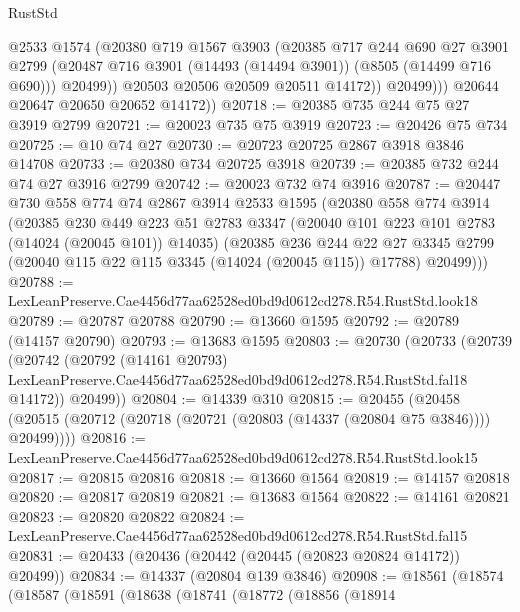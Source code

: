 \begin{lexlean}{RustStd}
\begin{coremodule}
                  @2533
                  @1574
                  (@20380
                    @719
                    @1567
                    @3903
                    (@20385
                      @717
                      @244
                      @690
                      @27
                      @3901
                      @2799
                      (@20487 @716 @3901 (@14493 (@14494 @3901)) (@8505 (@14499 @716 @690)))
                      @20499))
                  @20503
                  @20506
                  @20509
                  @20511
                  @14172))
              @20499)))
        @20644
        @20647
        @20650
        @20652
        @14172))
@20718 := @20385 @735 @244 @75 @27 @3919 @2799
@20721 := @20023 @735 @75 @3919
@20723 := @20426 @75 @734
@20725 := @10 @74 @27
@20730 := @20723 @20725 @2867 @3918 @3846 @14708
@20733 := @20380 @734 @20725 @3918
@20739 := @20385 @732 @244 @74 @27 @3916 @2799
@20742 := @20023 @732 @74 @3916
@20787 := @20447
    @730
    @558
    @774
    @74
    @2867
    @3914
    @2533
    @1595
    (@20380
      @558
      @774
      @3914
      (@20385
        @230
        @449
        @223
        @51
        @2783
        @3347
        (@20040 @101 @223 @101 @2783 (@14024 (@20045 @101)) @14035)
        (@20385
          @236
          @244
          @22
          @27
          @3345
          @2799
          (@20040 @115 @22 @115 @3345 (@14024 (@20045 @115)) @17788)
          @20499)))
@20788 := LexLeanPreserve.Cae4456d77aa62528ed0bd9d0612cd278.R54.RustStd.look18
@20789 := @20787 @20788
@20790 := @13660 @1595
@20792 := @20789 (@14157 @20790)
@20793 := @13683 @1595
@20803 := @20730
    (@20733
      (@20739
        (@20742
          (@20792
            (@14161 @20793)
            LexLeanPreserve.Cae4456d77aa62528ed0bd9d0612cd278.R54.RustStd.fal18
            @14172))
        @20499))
@20804 := @14339 @310
@20815 := @20455
    (@20458 (@20515 (@20712 (@20718 (@20721 (@20803 (@14337 (@20804 @75 @3846)))) @20499))))
@20816 := LexLeanPreserve.Cae4456d77aa62528ed0bd9d0612cd278.R54.RustStd.look15
@20817 := @20815 @20816
@20818 := @13660 @1564
@20819 := @14157 @20818
@20820 := @20817 @20819
@20821 := @13683 @1564
@20822 := @14161 @20821
@20823 := @20820 @20822
@20824 := LexLeanPreserve.Cae4456d77aa62528ed0bd9d0612cd278.R54.RustStd.fal15
@20831 := @20433 (@20436 (@20442 (@20445 (@20823 @20824 @14172)) @20499))
@20834 := @14337 (@20804 @139 @3846)
@20908 := @18561
    (@18574
      (@18587
        (@18591
          (@18638
            (@18741
              (@18772
                (@18856
                  (@18914

\end{coremodule}
\end{lexlean}
